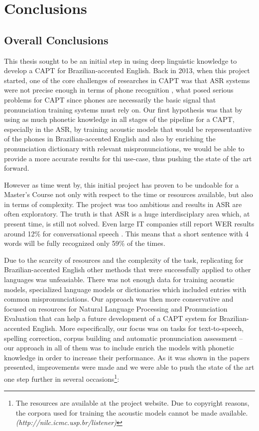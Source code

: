 \chapter{Conclusions}\label{ch:conclusions}

\section*{Overall Conclusions}\label{sec:overall-conclusions}

This thesis sought to be an initial step in using deep linguistic knowledge to develop a \ac{CAPT} for Brazilian-accented English. Back in 2013, when this project started, one of the core challenges of researches in \ac{CAPT} was that \ac{ASR} systems were not precise enough in terms of phone recognition \cite{Witt2012}, what posed serious problems for \ac{CAPT} since phones are necessarily the basic signal that pronunciation training systems must rely on. Our first hypothesis was that by using as much phonetic knowledge in all stages of the pipeline for a \ac{CAPT}, especially in the \ac{ASR}, by training acoustic models that would be representantive of the phones in Brazilian-accented English and also by enriching the pronunciation dictionary with relevant mispronunciations, we would be able to provide a more accurate results for thi use-case, thus pushing the state of the art forward.

However as time went by, this initial project has proven to be undoable for a Master's Course not only with respect to the time or resources available, but also in terms of complexity. The project was too ambitious and results in \ac{ASR} are often exploratory. The truth is that \ac{ASR} is a huge interdisciplary area which, at present time, is still not solved. Even large  IT companies still report \ac{WER} results around 12\% for conversational speech  \cite{Huang2014}. This means that a short sentence with 4 words will be fully recognized only 59\% of the times. 

Due to the scarcity of resources and the complexity of the task, replicating for Brazilian-accented English other methods that were successfully applied to other languages was unfeasiable. There was not enough data for training acoustic models, specialized language models or dictionaries which included entries with common mispronunciations. Our approach was then more conservative and focused on resources for Natural Language Processing and Pronunciation Evaluation that can help a future development of a \ac{CAPT} system for Brazilian-accented English. More especifically, our focus was on tasks for text-to-speech, spelling correction, corpus building and automatic pronunciation assessment -- our approach in all of them was to include enrich the models with phonetic knowledge in order to increase their performance. As it was shown in the papers presented, improvements were made and we were able to push the state of the art one step further in several occasions\footnote{The resources are available at the project website. Due to copyright reasons, the corpora used for training the acoustic models cannot be made available.  \emph{(http://nilc.icmc.usp.br/listener)}}:

